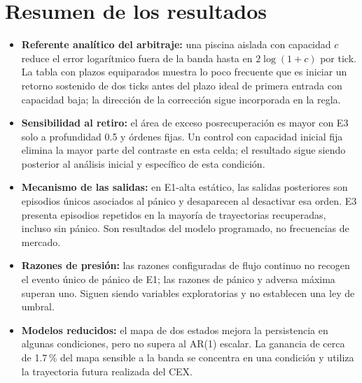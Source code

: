 \section{Resumen de los resultados}

\begin{itemize}
  \item \textbf{Referente analítico del arbitraje:} una piscina aislada con capacidad $c$ reduce el error logarítmico fuera de la banda hasta en $2\log(1+c)$ por tick. La tabla con plazos equiparados muestra lo poco frecuente que es iniciar un retorno sostenido de dos ticks antes del plazo ideal de primera entrada con capacidad baja; la dirección de la corrección sigue incorporada en la regla.
  \item \textbf{Sensibilidad al retiro:} el área de exceso posrecuperación es mayor con E3 solo a profundidad 0.5 y órdenes fijas. Un control con capacidad inicial fija elimina la mayor parte del contraste en esta celda; el resultado sigue siendo posterior al análisis inicial y específico de esta condición.
  \item \textbf{Mecanismo de las salidas:} en E1-alta estático, las salidas posteriores son episodios únicos asociados al pánico y desaparecen al desactivar esa orden. E3 presenta episodios repetidos en la mayoría de trayectorias recuperadas, incluso sin pánico. Son resultados del modelo programado, no frecuencias de mercado.
  \item \textbf{Razones de presión:} las razones configuradas de flujo continuo no recogen el evento único de pánico de E1; las razones de pánico y adversa máxima superan uno. Siguen siendo variables exploratorias y no establecen una ley de umbral.
  \item \textbf{Modelos reducidos:} el mapa de dos estados mejora la persistencia en algunas condiciones, pero no supera al AR(1) escalar. La ganancia de cerca de 1.7\,\% del mapa sensible a la banda se concentra en una condición y utiliza la trayectoria futura realizada del CEX.
\end{itemize}
